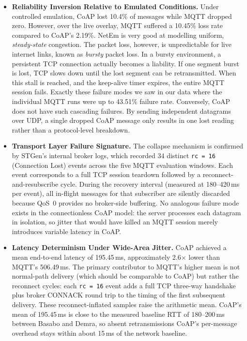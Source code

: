 \documentclass[jsan,article,submit,moreauthors,pdftex]{Definitions/mdpi}
\begin{document}
\begin{itemize}
    \item \textbf{Reliability Inversion Relative to Emulated Conditions.}
    Under controlled emulation, CoAP lost 10.4\% of messages while MQTT dropped zero. However, over the live overlay, MQTT suffered a 10.45\% loss rate compared to CoAP's 2.19\%. NetEm is very good at modelling uniform, \emph{steady-state} congestion. The packet loss, however, is unpredictable for live internet links, known as \emph{bursty} packet loss. In a bursty environment, a persistent TCP connection actually becomes a liability. If one segment burst is lost, TCP slows down until the lost segment can be retransmitted. When this stall is reached, and the keep-alive timer expires, the entire MQTT session fails. Exactly these failure modes we saw in our data where the individual MQTT runs were up to 43.51\% failure rate. Conversely, CoAP does not have such cascading failures. By sending independent datagrams over UDP, a single dropped CoAP message only results in one lost reading rather than a protocol-level breakdown.

    \item \textbf{Transport Layer Failure Signature.}
    The collapse mechanism is confirmed by STGen’s internal broker logs, which recorded 34 distinct \texttt{rc = 16} (Connection Lost) events across the five MQTT evaluation windows. Each event corresponds to a full TCP session teardown followed by a reconnect-and-resubscribe cycle. During the recovery interval (measured at 180--420\,ms per event), all in-flight messages for that subscriber are silently discarded because QoS~0 provides no broker-side buffering. No analogous failure mode exists in the connectionless CoAP model: the server processes each datagram in isolation, so jitter that would have killed an MQTT session merely introduces variable latency in CoAP.

    \item \textbf{Latency Determinism Under Wide-Area Jitter.}
    CoAP achieved a mean end-to-end latency of 195.45\,ms, approximately 2.6$\times$ lower than MQTT’s 506.49\,ms. The primary contributor to MQTT’s higher mean is not normal-path delivery (which should be comparable to CoAP) but rather the reconnect cycles: each \texttt{rc = 16} event adds a full TCP three-way handshake plus broker CONNACK round trip to the timing of the first subsequent delivery. These reconnect-inflated samples raise the arithmetic mean. CoAP's mean of 195.45\,ms is close to the measured baseline RTT of 180--200\,ms between Basabo and Demra, so absent retransmissions CoAP's per-message overhead stays within about 15\,ms of the network baseline.


\end{itemize}
\end{document}
